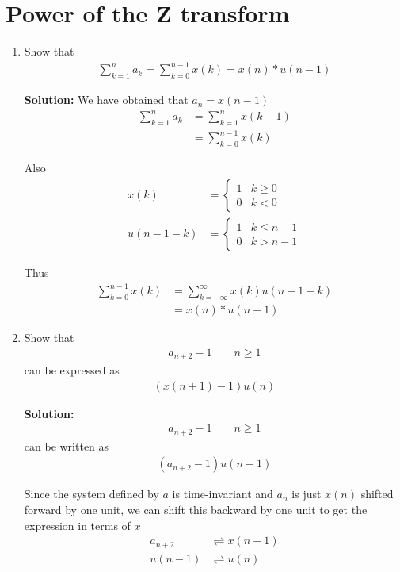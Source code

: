 \documentclass[journal,12pt,twocolumn]{IEEEtran}
\newcommand{\solution}{\noindent \textbf{Solution: }}
\numberwithin{equation}{section}
\renewcommand\thesection{\arabic{section}}
\begin{document}
\section{Power of the Z transform}
\begin{enumerate}[label=\thesection.\arabic*,ref=\thesection.\theenumi]
\item Show that 
\begin{align}
	\sum_{k=1}^{n}a_k = 
	\sum_{k=0}^{n-1}x(k) = x(n)*u(n-1)
\end{align}

\solution We have obtained that $a_n = x(n-1)$
\begin{align}
	\sum_{k=1}^{n}a_k &= \sum_{k=1}^n x(k-1) \\
	&= \sum_{k=0}^{n-1} x(k)
\end{align}

Also
\begin{align}
	x(k) &= 
	\begin{cases}
		1 & k \ge 0 \\
		0 & k < 0
	\end{cases} \\
	u(n-1-k) &=
	\begin{cases}
		1 & k \le n - 1 \\
		0 & k > n - 1
	\end{cases}
\end{align}

Thus
\begin{align}
	\sum_{k=0}^{n-1} x(k) &= \sum_{k=-\infty}^{\infty} x(k) u(n-1-k) \\
	&= x(n)*u(n-1)
\end{align}

\item Show that 
\begin{align}
a_{n+2}-1 \qquad n \ge 1
\end{align}
can be expressed as 
\begin{align}
	(x(n+1) - 1)u(n)
\end{align}

\solution 
\begin{align}
a_{n+2}-1 \qquad n \ge 1
\end{align}
can be written as
\begin{align}
(a_{n+2}-1) u(n-1)
\end{align}

Since the system defined by $a$ is time-invariant and $a_n$ is just $x(n)$ shifted forward by one unit, we can shift this backward by one unit to get the expression in terms of $x$
\begin{align}
	a_{n+2} &\rightleftharpoons x(n+1) \\
	u(n-1) &\rightleftharpoons u(n)
\end{align}


\end{enumerate}
\end{document}
